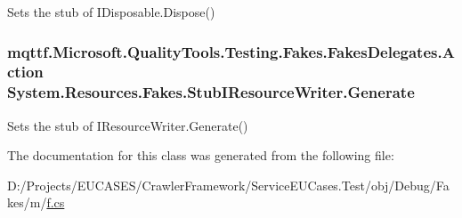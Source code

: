 Sets the stub of I\-Disposable.\-Dispose()

\hypertarget{class_system_1_1_resources_1_1_fakes_1_1_stub_i_resource_writer_a381f40b4573591ba129bc1d07292b22f}{
\subsubsection[{Generate}]{\setlength{\rightskip}{0pt plus 5cm}mqttf.\-Microsoft.\-Quality\-Tools.\-Testing.\-Fakes.\-Fakes\-Delegates.\-Action System.\-Resources.\-Fakes.\-Stub\-I\-Resource\-Writer.\-Generate}}\label{class_system_1_1_resources_1_1_fakes_1_1_stub_i_resource_writer_a381f40b4573591ba129bc1d07292b22f}


Sets the stub of I\-Resource\-Writer.\-Generate()



The documentation for this class was generated from the following file\-:\begin{DoxyCompactItemize}
\item 
D\-:/\-Projects/\-E\-U\-C\-A\-S\-E\-S/\-Crawler\-Framework/\-Service\-E\-U\-Cases.\-Test/obj/\-Debug/\-Fakes/m/\hyperlink{m_2f_8cs}{f.\-cs}\end{DoxyCompactItemize}
